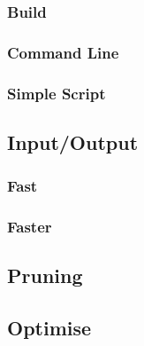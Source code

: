 \documentclass{article}
\begin{document}
\subsubsection{Build}

\subsubsection{Command Line}

\subsubsection{Simple Script}


\subsection{Input/Output}
\subsubsection{Fast}

\subsubsection{Faster}


\subsection{Pruning}


\subsection{Optimise}

\end{document}
